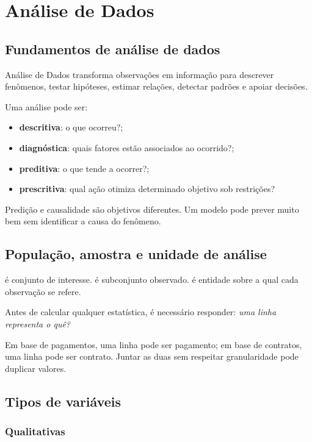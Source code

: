\chapter{Análise de Dados}

\section{Fundamentos de análise de dados}

Análise de Dados transforma observações em informação para descrever fenômenos, testar hipóteses, estimar relações, detectar padrões e apoiar decisões.

Uma análise pode ser:
\begin{itemize}
\item \textbf{descritiva}: o que ocorreu?;
\item \textbf{diagnóstica}: quais fatores estão associados ao ocorrido?;
\item \textbf{preditiva}: o que tende a ocorrer?;
\item \textbf{prescritiva}: qual ação otimiza determinado objetivo sob restrições?
\end{itemize}

Predição e causalidade são objetivos diferentes. Um modelo pode prever muito bem sem identificar a causa do fenômeno.

\section{População, amostra e unidade de análise}

 é conjunto de interesse.  é subconjunto observado.  é entidade sobre a qual cada observação se refere.

Antes de calcular qualquer estatística, é necessário responder: \emph{uma linha representa o quê?}

Em base de pagamentos, uma linha pode ser pagamento; em base de contratos, uma linha pode ser contrato. Juntar as duas sem respeitar granularidade pode duplicar valores.

\section{Tipos de variáveis}

\subsection{Qualitativas}

